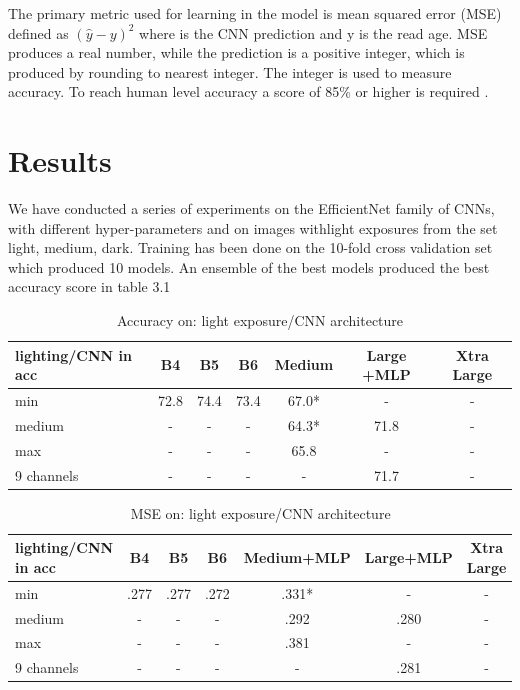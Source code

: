 \documentclass[10pt,letterpaper]{article}
\begin{document}
The primary metric used for learning in the model is mean squared error (MSE)
defined as $  ( \hat{y} - y)^{2} $ where  is the CNN prediction and y is the read age.
MSE produces a real number, while the prediction is a positive integer,
which is produced by rounding to nearest integer. 
The integer is used to measure accuracy. To reach human level accuracy
a score of 85\% or higher is required \citep{ref_needed}.

\section*{Results}

We have conducted a series of experiments on the EfficientNet family of CNNs, 
with different hyper-parameters and on images withlight exposures 
from the set light, medium, dark.
Training has been done on the 10-fold cross validation set which produced 10 models.
An ensemble of the best models produced the best accuracy score in table 3.1

\begin{center}
\begin{table}[hbt!]
\caption{Accuracy on: light exposure/CNN architecture}
\begin{tabular}{ |l|c|c|c|c|c|c| }

\hline
lighting/CNN in acc & B4 & B5 & B6 & Medium & Large +MLP & Xtra Large \\ \hline
min & 72.8 & 74.4 & 73.4 & 67.0* & - & - \\ 
medium & - & - & - & 64.3* & 71.8 & - \\ 
max & - & - & - & 65.8 & - & - \\ 
9 channels & - & - & - & - & 71.7 & - \\ 
\hline
\end{tabular}
\end{table}
\end{center}

\begin{center}
\begin{table}[hbt!]
\caption{MSE on: light exposure/CNN architecture}
\begin{tabular}{ |l|c|c|c|c|c|c| }

\hline
lighting/CNN in acc & B4 & B5 & B6 & Medium+MLP & Large+MLP & Xtra Large \\ \hline
min & .277 & .277 & .272 & .331* & - & - \\ 
medium & - & - & - & .292 & .280 & - \\ 
max & - & - & - & .381 & - & - \\ 
9 channels & - & - & - & - & .281 & - \\ 
\hline
\end{tabular}
\end{table}
\end{center}
\end{document}
